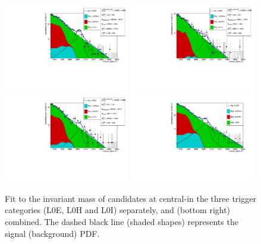 %
\begin{figure}[h!]
\centering
\includegraphics[width=0.49\textwidth]{RKst/figs/Fit/fit_EE/KstEE_central_L0E_log.pdf}
\includegraphics[width=0.49\textwidth]{RKst/figs/Fit/fit_EE/KstEE_central_L0H_log.pdf}
\includegraphics[width=0.49\textwidth]{RKst/figs/Fit/fit_EE/KstEE_central_L0I_log.pdf}
\includegraphics[width=0.49\textwidth]{RKst/figs/Fit/fit_EE/fit_EEc_log.pdf}
\caption{Fit to the \mKpiee invariant mass of \BdToKstee candidates at central-\qsq in the three trigger categories (L0E, L0H and L0I) separately, and (bottom right) combined. The dashed black line (shaded shapes) represents the signal (background) PDF.}
\label{fig:fitEE_central}
\end{figure}
